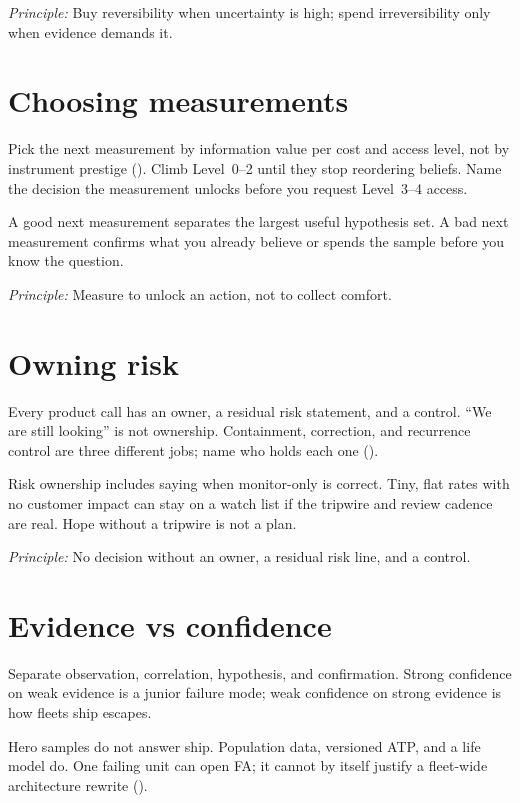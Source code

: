 \textit{Principle:} Buy reversibility when uncertainty is high; spend
irreversibility only when evidence demands it.

\section{Choosing measurements}
\label{sec:staff-measurements}

Pick the next measurement by information value per cost and access level, not
by instrument prestige ().
Climb Level~0--2 until they stop reordering beliefs. Name the decision the
measurement unlocks before you request Level~3--4 access.

A good next measurement separates the largest useful hypothesis set. A bad next
measurement confirms what you already believe or spends the sample before you
know the question.

\textit{Principle:} Measure to unlock an action, not to collect comfort.

\section{Owning risk}
\label{sec:staff-owning-risk}

Every product call has an owner, a residual risk statement, and a control.
``We are still looking'' is not ownership. Containment, correction, and
recurrence control are three different jobs; name who holds each one
().

Risk ownership includes saying when monitor-only is correct. Tiny, flat rates
with no customer impact can stay on a watch list if the tripwire and review
cadence are real. Hope without a tripwire is not a plan.

\textit{Principle:} No decision without an owner, a residual risk line, and a
control.

\section{Evidence vs confidence}
\label{sec:staff-evidence-confidence}

Separate observation, correlation, hypothesis, and confirmation. Strong
confidence on weak evidence is a junior failure mode; weak confidence on strong
evidence is how fleets ship escapes.

Hero samples do not answer ship. Population data, versioned ATP, and a life
model do. One failing unit can open FA; it cannot by itself justify a fleet-wide
architecture rewrite ().

